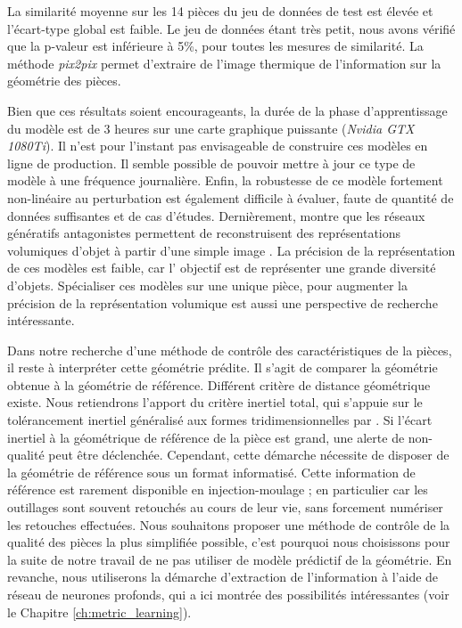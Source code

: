 La similarité moyenne sur les 14 pièces du jeu de données de test est élevée et l'écart-type global est faible.
Le jeu de données étant très petit, nous avons vérifié que la p-valeur est inférieure à 5\%, pour toutes les mesures de similarité.
La méthode \textit{pix2pix} permet d'extraire de l'image thermique de l'information sur la géométrie des pièces.

Bien que ces résultats soient encourageants, la durée de la phase d'apprentissage du modèle est de 3 heures sur une carte graphique puissante (\textit{Nvidia GTX 1080Ti}).
Il n'est pour l'instant pas envisageable de construire ces modèles en ligne de production.
Il semble possible de pouvoir mettre à jour ce type de modèle à une fréquence journalière.
Enfin, la robustesse de ce modèle fortement non-linéaire au perturbation est également difficile à évaluer, faute de quantité de données suffisantes et de cas d'études.
Dernièrement, \citeauthor{wu_learning_2016} montre que les réseaux génératifs antagonistes permettent de reconstruisent des représentations volumiques d'objet à partir d'une simple image \cite{wu_learning_2016}.
La précision de la représentation de ces modèles est faible, car l' objectif est de représenter une grande diversité d'objets.
Spécialiser ces modèles sur une unique pièce, pour augmenter la précision de la représentation volumique est aussi une perspective de recherche intéressante.

Dans notre recherche d'une méthode de contrôle des caractéristiques de la pièces, il reste à interpréter cette géométrie prédite.
Il s'agit  de comparer la géométrie obtenue à la géométrie de référence.
Différent critère de distance géométrique existe.
Nous retiendrons l'apport du critère inertiel total, qui s'appuie sur le tolérancement inertiel généralisé aux formes tridimensionnelles par \citeauthor{adragna_proposition_2010} \cite{adragna_proposition_2010}.
Si l'écart inertiel à la géométrique de référence de la pièce est grand, une alerte de non-qualité peut être déclenchée.
Cependant, cette démarche nécessite de disposer de la géométrie de référence sous un format informatisé.
Cette information de référence est rarement disponible en injection-moulage ; en particulier car les outillages sont souvent retouchés au cours de leur vie, sans forcement numériser les retouches effectuées.
Nous souhaitons proposer une méthode de contrôle de la qualité des pièces la plus simplifiée possible, c'est pourquoi nous choisissons pour la suite de notre travail de ne pas utiliser de modèle prédictif de la géométrie.
En revanche, nous utiliserons la démarche d'extraction de l'information à l'aide de réseau de neurones profonds, qui a ici montrée des possibilités intéressantes (voir le Chapitre \ref{ch:metric_learning}).

